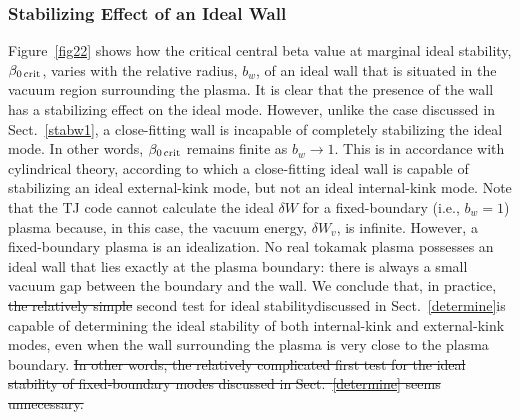 \documentclass[12pt,prb,aps]{revtex4-1}
\providecommand{\DIFadd}[1]{{\protect\color{blue}\uwave{#1}}} %
\providecommand{\DIFdel}[1]{{\protect\color{red}\sout{#1}}}                      %
\providecommand{\DIFaddbegin}{} %
\providecommand{\DIFaddend}{} %
\providecommand{\DIFdelbegin}{} %
\providecommand{\DIFdelend}{} %
\newcommand{\DIFscaledelfig}{0.5}
\newlength{\DIFdelgraphicswidth} %
\newlength{\DIFdelgraphicsheight} %
\newcommand{\DIFaddincludegraphics}[2][]{{\color{blue}\fbox{\DIFOincludegraphics[#1]{#2}}}} %
\newcommand{\DIFdelincludegraphics}[2][]{%
\sbox{\DIFdelgraphicsbox}{\DIFOincludegraphics[#1]{#2}}%
\settoboxwidth{\DIFdelgraphicswidth}{\DIFdelgraphicsbox} %
\settoboxtotalheight{\DIFdelgraphicsheight}{\DIFdelgraphicsbox} %
\scalebox{\DIFscaledelfig}{%
\parbox[b]{\DIFdelgraphicswidth}{\usebox{\DIFdelgraphicsbox}\\[-\baselineskip] \rule{\DIFdelgraphicswidth}{0em}}\llap{\resizebox{\DIFdelgraphicswidth}{\DIFdelgraphicsheight}{%
\setlength{\unitlength}{\DIFdelgraphicswidth}%
\begin{picture}(1,1)%
\thicklines\linethickness{2pt} %
{\color[rgb]{1,0,0}\put(0,0){\framebox(1,1){}}}%
{\color[rgb]{1,0,0}\put(0,0){\line( 1,1){1}}}%
{\color[rgb]{1,0,0}\put(0,1){\line(1,-1){1}}}%
\end{picture}%
}\hspace*{3pt}}} %
} %
\DeclareRobustCommand{\DIFaddbegin}{\DIFOaddbegin \let\includegraphics\DIFaddincludegraphics} %
\DeclareRobustCommand{\DIFaddend}{\DIFOaddend \let\includegraphics\DIFOincludegraphics} %
\DeclareRobustCommand{\DIFdelbegin}{\DIFOdelbegin \let\includegraphics\DIFdelincludegraphics} %
\DeclareRobustCommand{\DIFdelend}{\DIFOaddend \let\includegraphics\DIFOincludegraphics} %
\begin{document}
\subsubsection{Stabilizing Effect of an Ideal Wall}
Figure~\ref{fig22} shows how the critical central beta value at marginal ideal stability, $\beta_{0\,{\rm crit}}$, varies with the
relative radius, $b_w$, of an ideal wall that is situated in the vacuum region surrounding the plasma.  It is clear that the
presence of the wall has a stabilizing effect on the ideal mode.   However, unlike the case discussed in Sect.~\ref{stabw1}, a close-fitting wall is incapable of
completely stabilizing the ideal mode. In other words,  $\beta_{0\,{\rm crit}}$ remains finite as $b_w\rightarrow 1$. This is in accordance with cylindrical theory, according to which a close-fitting ideal
wall is capable of stabilizing an ideal external-kink mode, but not an ideal internal-kink mode.\cite{freidberg,wesson}
Note that the TJ code cannot calculate the ideal $\delta W$ for a fixed-boundary (i.e., $b_w=1$)  plasma because, in this
case, the vacuum energy, $\delta W_v$, is infinite. However, a fixed-boundary plasma is an idealization. No real tokamak
plasma possesses an ideal wall that lies exactly at the plasma boundary: there is always a small vacuum gap
between the boundary and the wall. We conclude that, in practice, \DIFdelbegin \DIFdel{the relatively simple }\DIFdelend \DIFaddbegin \DIFadd{our }\DIFaddend second test for ideal stability\DIFaddbegin \DIFadd{, 
which is }\DIFaddend discussed in Sect.~\ref{determine}\DIFaddbegin \DIFadd{, }\DIFaddend is capable of determining the ideal stability of both internal-kink and external-kink
modes, even when the wall surrounding the plasma is very close to the plasma boundary.
\DIFdelbegin \DIFdel{In other words, the
relatively complicated first test for the ideal stability of fixed-boundary modes discussed in Sect.~\ref{determine}
seems unnecessary. 
}\DIFdelend 
\end{document}
